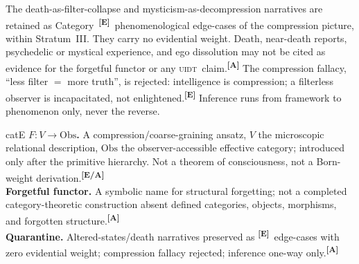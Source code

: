 \documentclass[12pt,a4paper,twoside]{article}
\theoremstyle{plain}
\theoremstyle{definition}
\theoremstyle{remark}
\newcommand{\UIDT}{\textsc{uidt}}
\newcommand{\catmark}[1]{\textsuperscript{\textsf{\textbf{[#1]}}}}
\begin{document}
\begin{governancebox}
The death-as-filter-collapse and mysticism-as-decompression narratives are retained as Category~\catmark{E}\ phenomenological edge-cases of the compression picture, within Stratum~III. They carry no evidential weight. Death, near-death reports, psychedelic or mystical experience, and ego dissolution may not be cited as evidence for the forgetful functor or any \UIDT\ claim.\catmark{A} The compression fallacy, ``less filter $=$ more truth'', is rejected: intelligence is compression; a filterless observer is incapacitated, not enlightened.\catmark{E} Inference runs from framework to phenomenon only, never the reverse.
\end{governancebox}

\begin{evidencebox}{catE}
\textbf{$F\colon V\to\mathrm{Obs}$.} A compression/coarse-graining ansatz, $V$ the microscopic relational description, $\mathrm{Obs}$ the observer-accessible effective category; introduced only after the primitive hierarchy. Not a theorem
of consciousness, not a Born-weight derivation.\catmark{E/A}\\[0.3em]
\textbf{Forgetful functor.} A symbolic name for structural forgetting; not a completed category-theoretic construction absent defined categories, objects,
morphisms, and forgotten structure.\catmark{A}\\[0.3em]
\textbf{Quarantine.} Altered-states/death narratives preserved as \catmark{E}\ edge-cases with zero evidential weight; compression fallacy rejected; inference one-way only.\catmark{A}
\end{evidencebox}

\end{document}
